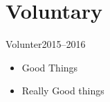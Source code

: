 \section*{\faPuzzlePiece Voluntary}
\begin{role}{Volunter}{2015--2016}
\begin{itemize}
    \item Good Things
    \item Really Good things
\end{itemize}
\end{role}

